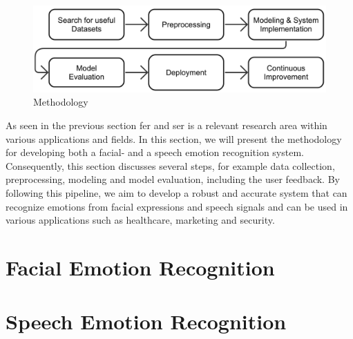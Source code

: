 \begin{figure}[h]
\centering
\includegraphics[width=\textwidth]{images/methodology2.png}
\caption{Methodology}\label{fig:methodology}
\end{figure}

\noindent As seen in the previous section \acrshort{fer} and \acrshort{ser} is a relevant research area within various applications and fields. In this section, we will present the methodology for developing both a facial- and a speech emotion recognition system. Consequently, this section discusses several steps, for example data collection, preprocessing, modeling and model evaluation, including the user feedback. By following this pipeline, we aim to develop a robust and accurate system that can recognize emotions from facial expressions and speech signals and can be used in various applications such as healthcare, marketing and security.

\section{Facial Emotion Recognition}

\section{Speech Emotion Recognition}


